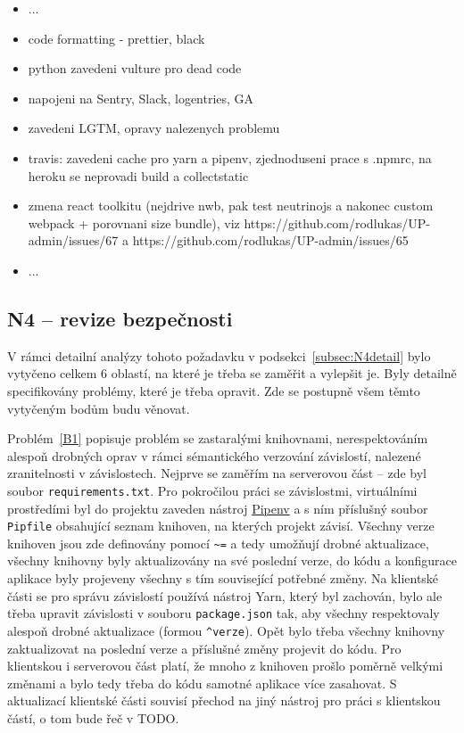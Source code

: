 \begin{itemize}
\item ...
\item code formatting - prettier, black
\item python zavedeni vulture pro dead code
\item napojeni na Sentry, Slack, logentries, GA
\item zavedeni LGTM, opravy nalezenych problemu
\item travis: zavedeni cache pro yarn a pipenv, zjednoduseni prace s .npmrc, na heroku se neprovadi build a collectstatic
\item zmena react toolkitu (nejdrive nwb, pak test neutrinojs a nakonec custom webpack + porovnani size bundle), viz https://github.com/rodlukas/UP-admin/issues/67 a https://github.com/rodlukas/UP-admin/issues/65
\item ...
\end{itemize}

\subsection{N4 -- revize bezpečnosti}\label{N4implementace}

V rámci detailní analýzy tohoto požadavku v podsekci~\ref{subsec:N4detail} bylo vytyčeno celkem 6 oblastí, na které je třeba se zaměřit a vylepšit je. Byly detailně specifikovány problémy, které je třeba opravit. Zde se postupně všem těmto vytyčeným bodům budu věnovat.

Problém~\ref{B1} popisuje problém se zastaralými knihovnami, nerespektováním alespoň drobných oprav v rámci sémantického verzování závislostí, nalezené zranitelnosti v závislostech. Nejprve se zaměřím na serverovou část -- zde byl soubor \verb|requirements.txt|. Pro pokročilou práci se závislostmi, virtuálními prostředími \cite{pipenv-realpython} byl do projektu zaveden nástroj \href{https://pipenv.pypa.io/en/latest/}{Pipenv} a s ním příslušný soubor \verb|Pipfile| obsahující seznam knihoven, na kterých projekt závisí. Všechny verze knihoven jsou zde definovány pomocí \verb|~=| a tedy umožňují drobné aktualizace, všechny knihovny byly aktualizovány na své poslední verze, do kódu a konfigurace aplikace byly projeveny všechny s tím související potřebné změny. Na klientské části se pro správu závislostí používá nástroj Yarn, který byl zachován, bylo ale třeba upravit závislosti v souboru \verb|package.json| tak, aby všechny respektovaly alespoň drobné aktualizace (formou \verb|^verze|). Opět bylo třeba všechny knihovny zaktualizovat na poslední verze a příslušné změny projevit do kódu. Pro klientskou i serverovou část platí, že mnoho z knihoven prošlo poměrně velkými změnami a bylo tedy třeba do kódu samotné aplikace více zasahovat. S aktualizací klientské části souvisí přechod na jiný nástroj pro práci s klientskou částí, o tom bude řeč v TODO.

